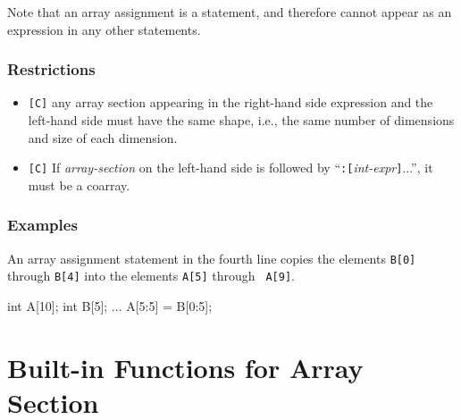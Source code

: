 
Note that an array assignment is a statement, and therefore cannot
appear as an expression in any other statements.

\subsubsection*{Restrictions}

\begin{itemize}
 \item \verb![C]! any array section appearing in the right-hand side expression and
	   the left-hand side must have the same shape, i.e., the same number of
	   dimensions and size of each dimension.
 \item \verb![C]! If {\it array-section} on the left-hand side is followed by
       ``{\tt :}{\tt [}{\it int-expr}{\tt ]}...'', it must be a coarray.
\end{itemize}

\subsubsection*{Examples}

An array assignment statement in the fourth line copies the elements
{\tt B[0]} through {\tt B[4]} into the elements {\tt A[5]} through {\tt
A[9]}.

\hspace{\hsize}
\begin{XCexample}
int A[10];
int B[5];
    ...
A[5:5] = B[0:5]; 
\end{XCexample}


\section{Built-in Functions for Array Section}

